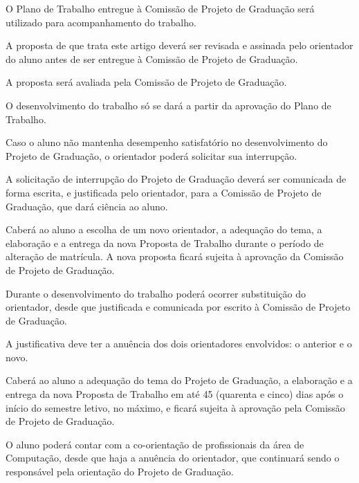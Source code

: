 \documentclass[12pt,geral,titlewithdate]{uftdocs}
\begin{document}
\artigo O Plano de Trabalho entregue à Comissão de Projeto de Graduação será utilizado para acompanhamento do trabalho.

\begin{paragrafos}
\paragrafo A proposta de que trata este artigo deverá ser revisada e assinada pelo orientador do aluno antes de ser entregue à Comissão de Projeto de Graduação.

\paragrafo A proposta será avaliada pela Comissão de Projeto de Graduação.

\paragrafo O desenvolvimento do trabalho só se dará a partir da aprovação do Plano de Trabalho.

\end{paragrafos}

\artigo Caso o aluno não mantenha desempenho satisfatório no desenvolvimento do Projeto de Graduação, o orientador poderá solicitar sua interrupção.

\begin{paragrafos}
\paragrafo A solicitação de interrupção do Projeto de Graduação deverá ser comunicada de forma escrita, e justificada pelo orientador, para a Comissão de Projeto de Graduação, que dará ciência ao aluno.

\paragrafo Caberá ao aluno a escolha de um novo orientador, a adequação do tema, a elaboração e a entrega da nova Proposta de Trabalho durante o período de alteração de matrícula. A nova proposta ficará sujeita à aprovação da Comissão de Projeto de Graduação.

\end{paragrafos}

\artigo Durante o desenvolvimento do trabalho poderá ocorrer substituição do orientador, desde que justificada e comunicada por escrito à Comissão de Projeto de Graduação.

\begin{paragrafos}
\paragrafo A justificativa deve ter a anuência dos dois orientadores envolvidos: o
anterior e o novo. 

\paragrafo Caberá ao aluno a adequação do tema do Projeto de Graduação, a elaboração e a entrega da nova Proposta de Trabalho em até 45 (quarenta e cinco) dias após o início do semestre letivo, no máximo, e ficará sujeita à aprovação pela Comissão de Projeto de Graduação.

\end{paragrafos}

\artigo O aluno poderá contar com a co-orientação de profissionais da área de Computação, desde que haja a anuência do orientador, que continuará sendo o responsável pela orientação do Projeto de Graduação.
\end{document}
